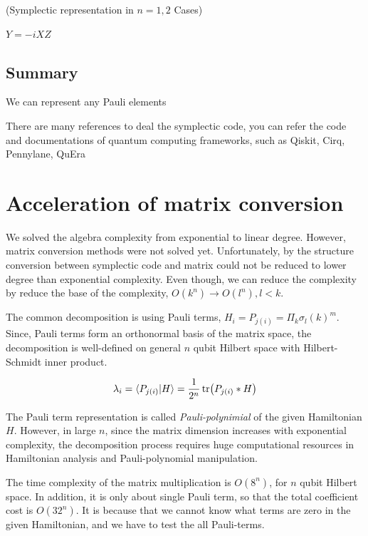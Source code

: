 \begin{example}(Symplectic representation in $n=1, 2$ Cases)

    $Y = -i XZ$
\end{example}




\subsection{Summary}

We can represent any Pauli elements

There are many references to deal the symplectic code, you can refer the code and documentations 
of quantum computing frameworks, such as Qiskit, Cirq, Pennylane, QuEra
\section{Acceleration of matrix conversion}

We solved the algebra complexity from exponential to linear degree. 
However, matrix conversion methods were not solved yet. 
Unfortunately, by the structure conversion between symplectic code and matrix 
could not be reduced to lower degree than exponential complexity.
Even though, we can reduce the complexity by reduce the base of the complexity, $O(k^n) \rightarrow O(l^n), l<k$.



The common decomposition is using Pauli terms, $H_i = P_{j(i)} = \Pi_{k} \sigma_l(k)^m$.
Since, Pauli terms form an orthonormal basis of the matrix space, 
the decomposition is well-defined on general $n$ qubit Hilbert space with 
Hilbert-Schmidt inner product.

\begin{equation}
    \lambda_i = \langle P_{j(i)} | H \rangle = \frac{1}{2^n} \tr(P_{j(i)} * H)
\end{equation}

The Pauli term representation is called \textit{Pauli-polynimial} of the given Hamiltonian $H$.
However, in large $n$, since the matrix dimension increases with exponential complexity,
the decomposition process requires huge computational resources 
in Hamiltonian analysis and Pauli-polynomial manipulation.

The time complexity of the matrix multiplication is $O(8^n)$, for $n$ qubit Hilbert space.
In addition, it is only about single Pauli term, so that the total coefficient cost is 
$O(32^n)$. It is because that we cannot know what terms are zero in the given 
Hamiltonian, and we have to test the all Pauli-terms.

